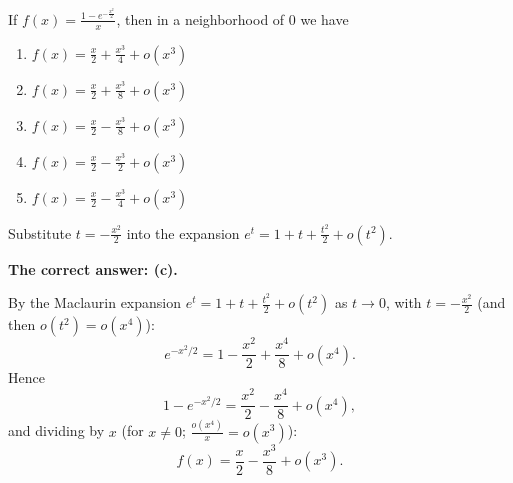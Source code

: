 
\begin{question}
If $f(x)=\frac{1-e^{-\frac{x^2}{2}}}{x}$, then in a neighborhood of $0$ we have
\begin{enumerate}
  \item[(a)] $f(x)=\frac{x}{2}+\frac{x^3}{4}+o(x^3)$
  \item[(b)] $f(x)=\frac{x}{2}+\frac{x^3}{8}+o(x^3)$
  \item[(c)] $f(x)=\frac{x}{2}-\frac{x^3}{8}+o(x^3)$
  \item[(d)] $f(x)=\frac{x}{2}-\frac{x^3}{2}+o(x^3)$
  \item[(e)] $f(x)=\frac{x}{2}-\frac{x^3}{4}+o(x^3)$
\end{enumerate}
\end{question}

\begin{hint}
Substitute $t=-\frac{x^2}{2}$ into the expansion $e^t=1+t+\frac{t^2}{2}+o(t^2)$.
\end{hint}

\begin{solution}
\textbf{The correct answer: (c).}

By the Maclaurin expansion $e^t=1+t+\frac{t^2}{2}+o(t^2)$ as $t\to0$, with $t=-\frac{x^2}{2}$ (and then $o(t^2)=o(x^4)$):
\[ e^{-x^2/2} = 1-\frac{x^2}{2}+\frac{x^4}{8}+o(x^4). \]
Hence
\[ 1-e^{-x^2/2} = \frac{x^2}{2}-\frac{x^4}{8}+o(x^4), \]
and dividing by $x$ (for $x\neq0$; $\frac{o(x^4)}{x}=o(x^3)$):
\[ f(x)=\frac{x}{2}-\frac{x^3}{8}+o(x^3). \]
\end{solution}
